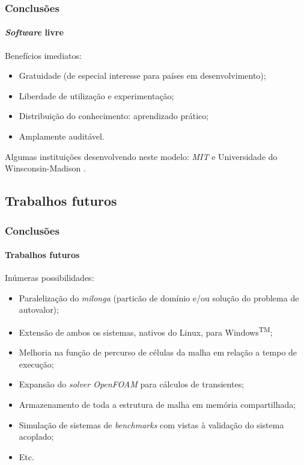 \documentclass[svgnames,smaller,table]{beamer}
\begin{document}
\begin{frame}
  \frametitle{Conclusões}
  \framesubtitle{\textit{Software} livre}
  Benefícios imediatos:
  \\
  \vspace{0.2cm}
  \begin{itemize}
  \item Gratuidade (de especial interesse para países em desenvolvimento);
  \item Liberdade de utilização e experimentação;
  \item Distribuição do conhecimento: aprendizado prático;
  \item Amplamente auditável.
  \end{itemize}
  \vspace{0.2cm}
  Algumas instituições desenvolvendo neste modelo: \textit{MIT} \cite{Romano2013, Boyd2014} e
  Universidade do Winsconsin-Madison \cite{Huff2016}.
\end{frame}

\subsection{Trabalhos futuros}
\begin{frame}
  \frametitle{Conclusões}
  \framesubtitle{Trabalhos futuros}
  Inúmeras possibilidades:
  \\
  \vspace{0.5cm}
  \begin{itemize}
  \item Paralelização do \textit{milonga} (particão de domínio e/ou solução do problema de autovalor);
  \item Extensão de ambos os sistemas, nativos do Linux, para Windows\textsuperscript{TM};
  \item Melhoria na função de percurso de células da malha em relação a tempo de execução;
  \item Expansão do \textit{solver OpenFOAM} para cálculos de transientes;
  \item Armazenamento de toda a estrutura de malha em memória compartilhada;
  \item Simulação de sistemas de \textit{benchmarks} com vistas à validação do sistema acoplado;
  \item Etc.
  \end{itemize}
\end{frame}
\end{document}

